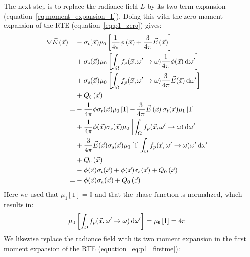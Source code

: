 The next step is to replace the radiance field $L$ by its two term expansion (equation~\ref{eq:moment_expansion_L}). Doing this with the zero moment expansion of the RTE (equation~\ref{eq:p1_zero}) gives:
\begin{align*}
\nabla\vec{E}\left(\vec{x}\right)=
&
-\sigma_t(\vec{x})\mu_0\left[\frac{1}{4\pi}\phi\left(\vec{x}\right) + \frac{3}{4\pi}\vec{E}\left(\vec{x}\right)\right]
\\
&
+\sigma_s(\vec{x})\mu_0\left[\int_{\Omega}f_p(\vec{x}, \omega'\rightarrow\omega)\frac{1}{4\pi}\phi(\vec{x})\,\mathrm{d}\omega'\right]
\\
&
+\sigma_s(\vec{x})\mu_0\left[\int_{\Omega}f_p(\vec{x}, \omega'\rightarrow\omega)\frac{3}{4\pi}\vec{E}(\vec{x})\,\mathrm{d}\omega'\right]
\\
&
\nonumber
+ Q_0\left(\vec{x}\right)
\\
=&
-\frac{1}{4\pi}\phi\sigma_t(\vec{x})\mu_0\left[1\right] - \frac{3}{4\pi}\vec{E}\left(\vec{x}\right)\sigma_t(\vec{x})\mu_1\left[1\right]
\\
&
+\frac{1}{4\pi}\phi(\vec{x})\sigma_s(\vec{x})\mu_0\left[\int_{\Omega}f_p(\vec{x}, \omega'\rightarrow\omega)\,\mathrm{d}\omega'\right]
\\
&
+\frac{3}{4\pi}\vec{E}(\vec{x})\sigma_s(\vec{x})\mu_1\left[1\right]\int_{\Omega}f_p(\vec{x}, \omega'\rightarrow\omega)\omega'\,\mathrm{d}\omega'
\\
&
+ Q_0\left(\vec{x}\right)
\\
=&
-\phi(\vec{x})\sigma_t(\vec{x})
+\phi(\vec{x})\sigma_s(\vec{x})
+Q_0\left(\vec{x}\right)
\\
=&
-\phi(\vec{x})\sigma_a(\vec{x})
+Q_0\left(\vec{x}\right)
\end{align*}
Here we used that $\mu_1[1] = 0$ and that the phase function is normalized, which results in:
\begin{align*}
\mu_0\left[\int_{\Omega}f_p(\vec{x}, \omega'\rightarrow\omega)\,\mathrm{d}\omega'\right] = \mu_0\left[1\right] = 4\pi
\end{align*}
We likewise replace the radiance field with its two moment expansion in the first moment expansion of the RTE (equation~\ref{eq:p1_firstme}):
